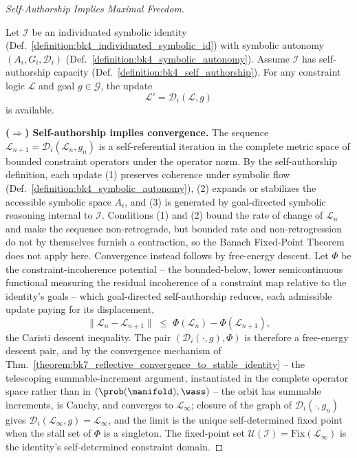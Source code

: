 \begin{proof}[Self-Authorship Implies Maximal Freedom]
\label{proof:bk4_maximal_freedom_autonomous_constraints}
\leavevmode

Let $\mathcal{I}$ be an individuated symbolic identity
(Def.~\ref{definition:bk4_individuated_symbolic_id}) with symbolic autonomy
$(A_i, G_i, \mathcal{D}_i)$
(Def.~\ref{definition:bk4_symbolic_autonomy}).
Assume $\mathcal{I}$ has self-authorship capacity
(Def.~\ref{definition:bk4_self_authorship}).
For any constraint logic $\mathcal{L}$ and goal $g \in \mathcal{G}$, the update
\[
\mathcal{L}' = \mathcal{D}_i(\mathcal{L}, g)
\]
is available.

\textbf{($\Rightarrow$) Self-authorship implies convergence.}
The sequence $\mathcal{L}_{n+1} = \mathcal{D}_i(\mathcal{L}_n, g_n)$ is a self-referential
iteration in the complete metric space of bounded constraint operators under the
operator norm. By the self-authorship definition, each update
(1) preserves coherence under symbolic flow (Def.~\ref{definition:bk4_symbolic_autonomy}),
(2) expands or stabilizes the accessible symbolic space $A_i$, and
(3) is generated by goal-directed symbolic reasoning internal to $\mathcal{I}$.
Conditions (1) and (2) bound the rate of change of $\mathcal{L}_n$ and make the
sequence non-retrograde, but bounded rate and non-retrogression do not by themselves
furnish a contraction, so the Banach Fixed-Point Theorem does not apply here.
Convergence instead follows by free-energy descent. Let $\Phi$ be the
constraint-incoherence potential -- the bounded-below, lower semicontinuous functional
measuring the residual incoherence of a constraint map relative to the identity's
goals -- which goal-directed self-authorship reduces, each admissible update paying for
its displacement,
\[
\|\mathcal{L}_n - \mathcal{L}_{n+1}\| \;\le\; \Phi(\mathcal{L}_n) - \Phi(\mathcal{L}_{n+1}),
\]
the Caristi descent inequality. The pair $(\mathcal{D}_i(\cdot, g), \Phi)$ is therefore
a free-energy descent pair, and by the convergence mechanism of
Thm.~\ref{theorem:bk7_reflective_convergence_to_stable_identity} -- the telescoping
summable-increment argument, instantiated in the complete operator space rather than in
$(\prob(\manifold), \wass)$ -- the orbit has summable increments, is Cauchy, and
converges to $\mathcal{L}_\infty$; closure of the graph of $\mathcal{D}_i(\cdot, g_n)$
gives $\mathcal{D}_i(\mathcal{L}_\infty, g) = \mathcal{L}_\infty$, and the limit is the
unique self-determined fixed point when the stall set of $\Phi$ is a singleton.
The fixed-point set $\mathcal{U}(\mathcal{I}) = \mathrm{Fix}(\mathcal{L}_\infty)$
is the identity's self-determined constraint domain.


\end{proof}
